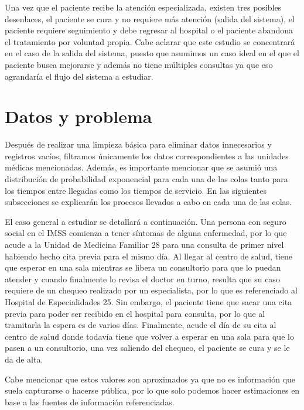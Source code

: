 \documentclass[10pt]{article}
\begin{document}
    Una vez que el paciente recibe la atención especializada, existen tres posibles desenlaces, el paciente se cura y no requiere más atención (salida del sistema), el paciente requiere seguimiento y debe regresar al hospital o el paciente abandona el tratamiento por voluntad propia. Cabe aclarar que este estudio se concentrará en el caso de la salida del sistema, puesto que asumimos un caso ideal en el que el paciente busca mejorarse y además no tiene múltiples consultas ya que eso agrandaría el flujo del sistema a estudiar.

    \section{Datos y problema}
    Después de realizar una limpieza básica para eliminar datos innecesarios y registros vacíos, filtramos únicamente los datos correspondientes a las unidades médicas mencionadas. Además, es importante mencionar que se asumió una distribución de probabilidad exponencial para cada una de las colas tanto para los tiempos entre llegadas como los tiempos de servicio. En las siguientes subsecciones se explicarán los procesos llevados a cabo en cada una de las colas. \par
    El caso general a estudiar se detallará a continuación. Una persona con seguro social en el IMSS comienza a tener síntomas de alguna enfermedad, por lo que acude a la Unidad de Medicina Familiar 28 para una consulta de primer nivel habiendo hecho cita previa para el mismo día. Al llegar al centro de salud, tiene que esperar en una sala mientras se libera un consultorio para que lo puedan atender y cuando finalmente lo revisa el doctor en turno, resulta que su caso requiere de un chequeo realizado por un especialista, por lo que es referenciado al Hospital de Especialidades 25. Sin embargo, el paciente tiene que sacar una cita previa para poder ser recibido en el hospital para consulta, por lo que al tramitarla la espera es de varios días. Finalmente, acude el día de su cita al centro de salud donde todavía tiene que volver a esperar en una sala para que lo pasen a un consultorio, una vez saliendo del chequeo, el paciente se cura y se le da de alta. \par
    Cabe mencionar que estos valores son aproximados ya que no es información que suela capturarse o hacerse pública, por lo que solo podemos hacer estimaciones en base a las fuentes de información referenciadas. \par
    
\end{document}
